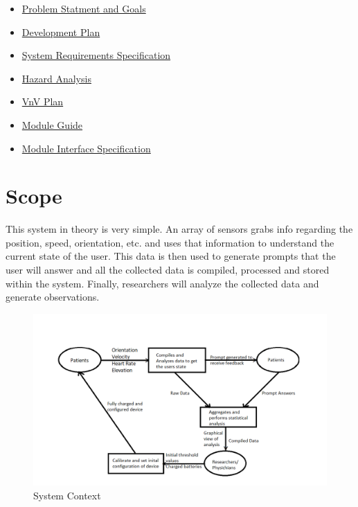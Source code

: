 \documentclass[12pt, titlepage]{article}
\begin{document}
\begin{itemize}
	\item \href{https://github.com/zakerl/Capstone_Project/blob/main/docs/ProblemStatementAndGoals/Team1_ProblemStatement\%20\%26\%20Goals.pdf}{Problem Statment and Goals}
	\item \href{https://github.com/zakerl/Capstone_Project/blob/main/docs/DevelopmentPlan/DevelopmentPlan.pdf}{Development Plan}
	\item \href{https://github.com/zakerl/Capstone_Project/blob/main/docs/SRS/SRS.pdf}{System Requirements Specification}
	\item \href{https://github.com/zakerl/Capstone_Project/blob/main/docs/HazardAnalysis/HazardAnalysis.pdf}{Hazard Analysis}
	\item \href{https://github.com/zakerl/Capstone_Project/blob/main/docs/VnVPlan/VnVPlan.pdf}{VnV Plan}
	\item \href{https://github.com/zakerl/Capstone_Project/blob/main/docs/Design/SoftArchitecture/MG.pdf}{Module Guide}
	\item \href{https://github.com/zakerl/Capstone_Project/blob/main/docs/Design/SoftDetailedDes/MIS.pdf}{Module Interface Specification}
\end{itemize}

\section{Scope}

This system in theory is very simple. An array of sensors grabs info regarding the position, speed, orientation, etc. and uses that information to understand the current state of the user. This data is then used to generate prompts that the user will answer and all the collected data is compiled, processed and stored within the system. Finally, researchers will analyze the collected data and generate observations. \\

\begin{figure}[H]
\begin{center}
 \includegraphics[width=.95\textwidth]{System Context Diagram}
\caption{System Context}
\label{Fig_SystemContext} 
\end{center}
\end{figure}
\end{document}
